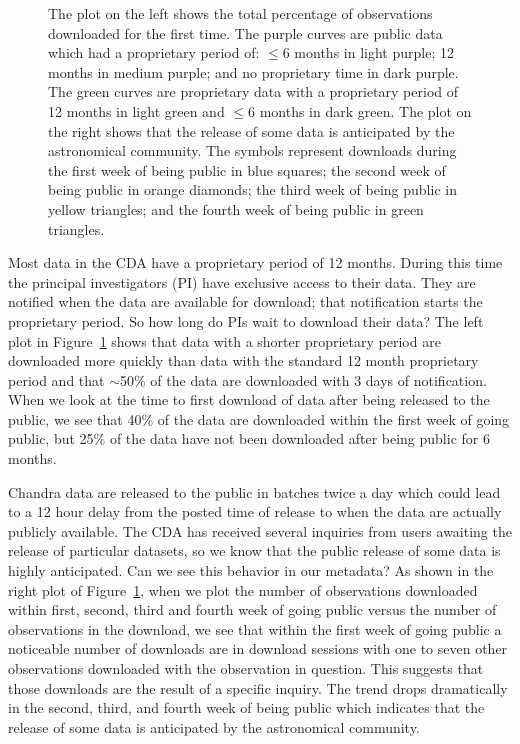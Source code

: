 \begin{figure}[top]
\caption[FirstDownload] 
  { \label{fig:FirstDownload}
The plot on the left shows the total percentage of observations downloaded for the first time.  The purple curves are public data which had a proprietary period of: $\leq 6$ months in light purple; 12 months in medium purple; and no proprietary time in dark purple. The green curves are proprietary data with a proprietary period of 12 months in light green and $\leq 6$ months in dark green.  The plot on the right shows that the release of some data is anticipated by the astronomical community.  The symbols represent downloads during the first week of being public in blue squares; the second week of being public in orange diamonds; the third week of being public in yellow triangles; and the fourth week of being public in green triangles.
}
\end{figure}
 
Most data in the CDA have a proprietary period of 12 months.  During this time the principal investigators (PI) have exclusive access to their data.  They are notified when the data are available for download; that notification starts the proprietary period.  So how long do PIs wait to download their data?  The left plot in Figure~\ref{fig:FirstDownload} shows that data with a shorter proprietary period are downloaded more quickly than data with the standard 12 month proprietary period and that $\sim$50\% of the data are downloaded with 3 days of notification.  When we look at the time to first download of data after being released to the public, we see that 40\% of the data are downloaded within the first week of going public, but 25\% of the data have not been downloaded after being public for 6 months.

Chandra data are released to the public in batches twice a day which could lead to a 12 hour delay from the posted time of release to when the data are actually publicly available.  The CDA has received several inquiries from users awaiting the release of particular datasets, so we know that the public release of some data is highly anticipated.  Can we see this behavior in our metadata?  As shown in the right plot of Figure~\ref{fig:FirstDownload}, when we plot the number of observations downloaded within first, second, third and fourth week of going public versus the number of observations in the download, we see that within the first week of going public a noticeable number of downloads are in download sessions with one to seven other observations downloaded with the observation in question.  This suggests that those downloads are the result of a specific inquiry.  The trend drops dramatically in the second, third, and fourth week of being public which indicates that the release of some data is anticipated by the astronomical community.

